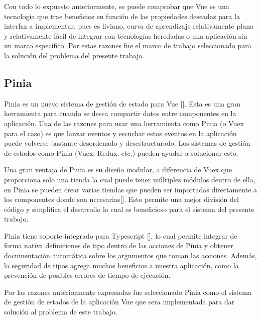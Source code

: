 Con todo lo expuesto anteriormente, se puede comprobar que Vue es una tecnología que trae beneficios en función de las propiedades deseadas para la interfaz a implementar, pues es liviano, curva de aprendizaje relativamente plana y relativamente fácil de integrar con tecnologías heredadas o una aplicación sin un marco específico. Por estas razones fue el marco de trabajo seleccionado para la solución del problema del presente trabajo.

\subsection{Pinia}


Pinia es un nuevo sistema de gestión de estado para Vue [\cite{57}]. Esta es una gran herramienta para cuando se desea compartir datos entre componentes en la aplicación. Una de las razones para usar una herramienta como Pinia (o Vuex para el caso) es que lanzar eventos y escuchar estos eventos en la aplicación puede volverse bastante desordenado y desestructurado. Los sistemas de gestión de estados como Pinia (Vuex, Redux, etc.) pueden ayudar a solucionar esto.

Una gran ventaja de Pinia es su diseño modular, a diferencia de Vuex que proporciona solo una tienda la cual puede tener múltiples módulos dentro de ella, en Pinia se pueden crear varias tiendas que pueden ser importadas directamente a los componentes donde son necesarias[\cite{57}]. Esto permite una mejor división del código y simplifica el desarrollo lo cual es beneficioso para el sistema del presente trabajo.

Pinia tiene soporte integrado para Typescript [\cite{57}], lo cual permite integrar de forma nativa definiciones de tipo dentro de las acciones de Pinia y obtener documentación automática sobre los argumentos que toman las acciones. Además, la seguridad de tipos agrega muchos beneficios a nuestra aplicación, como la prevención de posibles errores de tiempo de ejecución.

Por las razones anteriormente expresadas fue seleccionado Pinia como el sistema de gestión de estados de la aplicación Vue que sera implementada para dar solución al problema de este trabajo.

